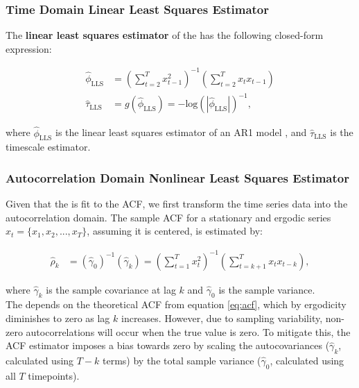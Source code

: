 \documentclass[main.tex]{subfiles}
\begin{document}
\subsubsection{Time Domain Linear Least Squares Estimator}
The \textbf{linear least squares estimator} of the  has the following closed-form expression:

\begin{align}
    \hat\phi_{\scriptscriptstyle\text{LLS}} &= (\sum_{t=2}^T x_{t-1}^2)^{-1} (\sum_{t=2}^T x_t x_{t-1})\\
    \hat\tau_{\scriptscriptstyle\text{LLS}} &= g(\hat\phi_{\scriptscriptstyle\text{LLS}}) = - {\text{log}(|\hat\phi_{\scriptscriptstyle\text{LLS}}|)}^{-1},
\end{align}

\noindent where $\hat\phi_{\scriptscriptstyle\text{LLS}}$ is the linear least squares estimator of an AR1 model \citep[chapter~14.3]{hansen_econometrics_2022}, and $\hat\tau_{\scriptscriptstyle\text{LLS}}$ is the timescale estimator.\\


\subsubsection{Autocorrelation Domain Nonlinear Least Squares Estimator}

Given that the  is fit to the ACF, we first transform the time series data into the autocorrelation domain. The sample ACF for a stationary and ergodic series $x_t = \{x_1, x_2, ..., x_T\}$, assuming it is centered, is estimated by:

\begin{align}\label{eq:acf_}
    \hat\rho_k &= (\hat\gamma_0)^{-1}(\hat\gamma_k) = (\sum_{t=1}^T x_t^2)^{-1} (\sum_{t=k+1}^{T}x_t x_{t-k}),
\end{align}

\noindent where $\hat\gamma_k$ is the sample covariance at lag $k$ and $\hat\gamma_0$ is the sample variance.\\


The  depends on the theoretical ACF from equation \eqref{eq:acf}, which by ergodicity diminishes to zero as lag $k$ increases. However, due to sampling variability, non-zero autocorrelations will occur when the true value is zero. To mitigate this, the ACF estimator imposes a bias towards zero by scaling the autocovariances ($\hat \gamma_k$, calculated using $T-k$ terms) by the total sample variance ($\hat\gamma_0$, calculated using all $T$ timepoints). \\
\end{document}
